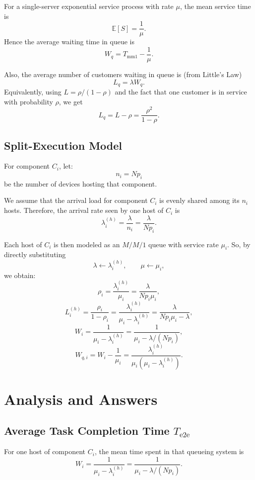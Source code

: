 \documentclass[12pt,a4paper]{article}
\begin{document}
For a single-server exponential service process with rate $\mu$, the mean service time is
\[
\mathbb{E}[S] = \frac{1}{\mu}.
\]
Hence the average waiting time in queue is
\[
W_q = T_{\text{mm1}} - \frac{1}{\mu}.
\]

Also, the average number of customers waiting in queue is (from Little's Law)
\[
L_q = \lambda W_q.
\]
Equivalently, using $L = \rho/(1-\rho)$ and the fact that one customer is in service with probability $\rho$, we get
\[
L_q = L - \rho = \frac{\rho^2}{1-\rho}.
\]

\subsection{Split-Execution Model}

For component $C_i$, let:
\[
n_i = Np_i
\]
be the number of devices hosting that component.

We assume that the arrival load for component $C_i$ is evenly shared among its $n_i$ hosts. Therefore, the arrival rate seen by one host of $C_i$ is
\[
\lambda_i^{(h)} = \frac{\lambda}{n_i} = \frac{\lambda}{Np_i}.
\]

Each host of $C_i$ is then modeled as an $M/M/1$ queue with service rate $\mu_i$.
So, by directly substituting
\[
\lambda \leftarrow \lambda_i^{(h)}, \qquad \mu \leftarrow \mu_i,
\]
we obtain:
\[
\rho_i = \frac{\lambda_i^{(h)}}{\mu_i}
       = \frac{\lambda}{Np_i\mu_i},
\]
\[
L_i^{(h)} = \frac{\rho_i}{1-\rho_i}
          = \frac{\lambda_i^{(h)}}{\mu_i-\lambda_i^{(h)}}
          = \frac{\lambda}{Np_i\mu_i-\lambda},
\]
\[
W_i = \frac{1}{\mu_i-\lambda_i^{(h)}}
    = \frac{1}{\mu_i-\lambda/(Np_i)},
\]
\[
W_{q,i} = W_i - \frac{1}{\mu_i}
        = \frac{\lambda_i^{(h)}}{\mu_i\left(\mu_i-\lambda_i^{(h)}\right)}.
\]

\section{Analysis and Answers}

\subsection{Average Task Completion Time $T_{\text{e2e}}$}

For one host of component $C_i$, the mean time spent in that queueing system is
\[
W_i = \frac{1}{\mu_i - \lambda_i^{(h)}}
    = \frac{1}{\mu_i - \lambda/(Np_i)}.
\]
\end{document}
